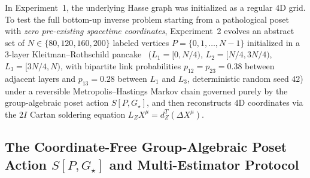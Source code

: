 \documentclass[11pt,a4paper]{article}
\theoremstyle{definition}
\theoremstyle{remark}
\newcommand{\Gstar}{G_\star}
\begin{document}
In Experiment~1, the underlying Hasse graph was initialized as a regular $4\text{D}$ grid. To test the full bottom-up inverse problem starting from a pathological poset with \emph{zero pre-existing spacetime coordinates}, Experiment~2 evolves an abstract set of $N \in \{80, 120, 160, 200\}$ labeled vertices $P = \{0, 1, \dots, N-1\}$ initialized in a $3$-layer Kleitman--Rothschild pancake~\cite{KleitmanRothschild1975} ($L_1 = [0, N/4)$, $L_2 = [N/4, 3N/4)$, $L_3 = [3N/4, N)$, with bipartite link probabilities $p_{12} = p_{23} = 0.38$ between adjacent layers and $p_{13} = 0.28$ between $L_1$ and $L_3$, deterministic random seed $42$) under a reversible Metropolis--Hastings Markov chain governed purely by the group-algebraic poset action $S[P, \Gstar]$, and then reconstructs $4\text{D}$ coordinates via the $2I$ Cartan soldering equation $L_Z X^\mu = d_Z^T(\Delta X^\mu)$.

\subsection{The Coordinate-Free Group-Algebraic Poset Action \texorpdfstring{$S[P, \Gstar]$}{S[P, G*]} and Multi-Estimator Protocol}
\end{document}
